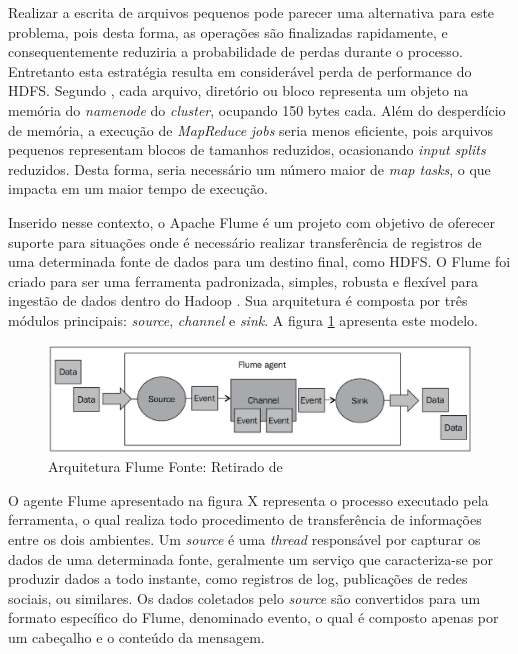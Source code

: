 Realizar a escrita de arquivos pequenos pode parecer uma alternativa para este problema, pois desta forma, as operações são finalizadas rapidamente, e consequentemente reduziria a probabilidade de perdas durante o processo. Entretanto esta estratégia resulta em considerável perda de performance do HDFS. Segundo , cada arquivo, diretório ou bloco representa um objeto na memória do \textit{namenode} do \textit{cluster}, ocupando 150 bytes cada. Além do desperdício de memória, a execução de \textit{MapReduce} \textit{jobs} seria menos eficiente, pois arquivos pequenos representam blocos de tamanhos reduzidos, ocasionando \textit{input splits} reduzidos. Desta forma, seria necessário um número maior de \textit{map tasks}, o que impacta em um maior tempo de execução.

Inserido nesse contexto, o Apache Flume é um projeto com objetivo de oferecer suporte para situações onde é necessário realizar transferência de registros de uma determinada fonte de dados para um destino final, como HDFS. O Flume foi criado para ser uma ferramenta padronizada, simples, robusta e flexível para ingestão de dados dentro do Hadoop \cite{hoffmanFlume}. Sua arquitetura é composta por três módulos principais: \textit{source}, \textit{channel} e \textit{sink}. A figura \ref{flume-arch} apresenta este modelo.

\begin{figure}[ht!]
	\centering
	\includegraphics[keepaspectratio=true,scale=0.4]
	  {figuras/flume.eps}
	\caption[Arquitetura Flume]{Arquitetura Flume
	\protect\linebreak Fonte: Retirado de \cite{hoffmanFlume}}
	\label{flume-arch}
\end{figure}
\FloatBarrier

O agente Flume apresentado na figura X representa o processo executado pela ferramenta, o qual realiza todo procedimento de transferência de informações entre os dois ambientes. Um \textit{source} é uma \textit{thread} responsável por capturar os dados de uma determinada fonte, geralmente um serviço que caracteriza-se por produzir dados a todo instante, como registros de log, publicações de redes sociais, ou similares. Os dados coletados pelo \textit{source} são convertidos para um formato específico do Flume, denominado evento, o qual é composto apenas por um cabeçalho e o conteúdo da mensagem.


